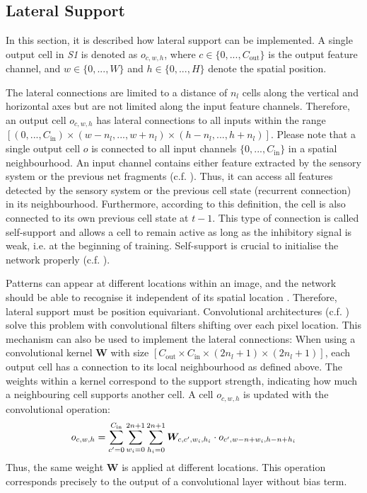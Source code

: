 \subsection{Lateral Support}
In this section, it is described how lateral support can be implemented.
A single output cell in \emph{S1} is denoted as $o_{c,w,h}$, where $c \in \{0, ..., C_{\text{out}}\}$ is the output feature channel, and $w \in \{0, ..., W\}$ and $h \in \{0, ..., H\}$ denote the spatial position.

The lateral connections are limited to a distance of $n_{l}$ cells along the vertical and horizontal axes but are not limited along the input feature channels.
Therefore, an output cell $o_{c,w,h}$ has lateral connections to all inputs within the range $\left[(0, ..., C_{\text{in}}) \times (w - n_l, ..., w+n_l) \times (h - n_l, ..., h+n_l)\right]$.
Please note that a single output cell $o$ is connected to all input channels $\{0, ..., C_{\text{in}}\}$ in a spatial neighbourhood. An input channel contains either feature extracted by the sensory system or the previous net fragments (c.f. ). Thus, it can access all features detected by the sensory system or the previous cell state (recurrent connection) in its neighbourhood.
Furthermore, according to this definition, the cell is also connected to its own previous cell state at $t-1$.
This type of connection is called self-support and allows a cell to remain active as long as the inhibitory signal is weak, i.e. at the beginning of training.
Self-support is crucial to initialise the network properly (c.f. ).

Patterns can appear at different locations within an image, and the network should be able to recognise it independent of its spatial location . 
Therefore, lateral support must be position equivariant.
Convolutional architectures (c.f. ) solve this problem with convolutional filters shifting over each pixel location. This mechanism can also be used to implement the lateral connections: When using a convolutional kernel $\boldsymbol{W}$ with size $\left[C_{\text{out}} \times C_{\text{in}} \times (2n_l+1) \times (2n_l+1) \right]$, each output cell has a connection to its local neighbourhood as defined above.
The weights within a kernel correspond to the support strength, indicating how much a neighbouring cell supports another cell. A cell $o_{c,w,h}$ is updated with the convolutional operation: 
%
\begin{align}\eqlbl{convlat_1}
	o_{c,w,h} = \sum_{c'=0}^{C_{\text{in}}} \sum_{w_i=0}^{2n+1} \sum_{h_i=0}^{2n+1} \boldsymbol{W}_{c, c',w_i,h_i} \cdot o_{c',w-n+w_i,h-n+h_i}
\end{align}
%
Thus, the same weight $\boldsymbol{W}$ is applied at different locations.
This operation corresponds precisely to the output of a convolutional layer without bias term.


